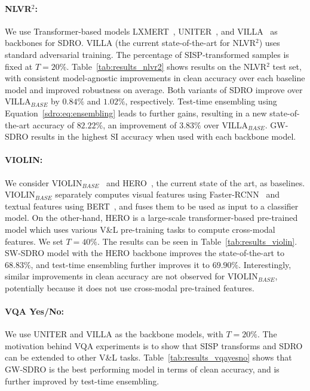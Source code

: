 \paragraph{NLVR$^2$:}

We use Transformer-based models LXMERT~\citep{tan2019lxmert}, UNITER~\citep{chen2020uniter}, and VILLA~\citep{gan2020large} as backbones for SDRO. 
VILLA (the current state-of-the-art for NLVR$^2$) uses standard adversarial training.
The percentage of SISP-transformed samples is fixed at $T{=}20\%$.
Table~\ref{tab:results_nlvr2} shows results on the NLVR$^2$ test set, with consistent model-agnostic improvements in clean accuracy over each baseline model and improved robustness on average.
Both variants of SDRO improve over VILLA$_{BASE}$ by $0.84\%$ and $1.02\%$, respectively.
Test-time ensembling using Equation~\ref{sdro:eq:ensembling} leads to further gains, resulting in a new state-of-the-art accuracy of $82.22\%$, an improvement of $3.83\%$ over VILLA$_{BASE}$.
GW-SDRO results in the highest SI accuracy when used with each backbone model.



\paragraph{VIOLIN:}

We consider VIOLIN$_{BASE}$~\citep{liu2020violin} and HERO~\citep{li2020hero}, the current state of the art, as baselines.
VIOLIN$_{BASE}$ separately computes visual features using Faster-RCNN~\citep{ren2015faster} and textual features using BERT~\citep{devlin2019bert}, and fuses them to be used as input to a classifier model.
On the other-hand, HERO is a large-scale transformer-based pre-trained model which uses various V\&L pre-training tasks to compute cross-modal features.
We set $T{=}40\%$.
The results can be seen in Table~\ref{tab:results_violin}.
SW-SDRO model with the HERO backbone improves the state-of-the-art to $68.83\%$, and test-time ensembling further improves it to $69.90\%$. 
Interestingly, similar improvements in clean accuracy are not observed for VIOLIN$_{BASE}$, potentially because it does not use cross-modal pre-trained features.

\paragraph{VQA Yes/No:}

We use UNITER and VILLA as the backbone models, with $T{=}20\%$.
The motivation behind VQA experiments is to show that SISP transforms and SDRO can be extended to other V\&L tasks.
Table~\ref{tab:results_vqayesno} shows that GW-SDRO is the best performing model in terms of clean accuracy, and is further improved by test-time ensembling.


